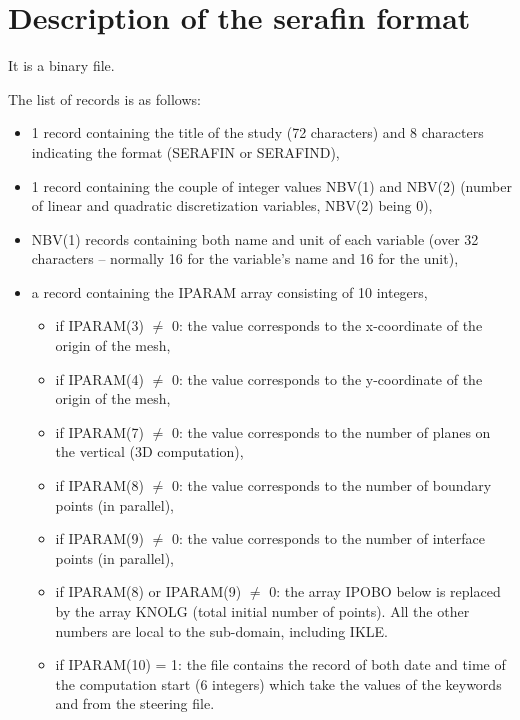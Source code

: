 \chapter{Description of the serafin format}
\label{sec:srffmt}
It is a binary file.

The list of records is as follows:

\begin{itemize}
\item 1 record containing the title of the study (72 characters) and 8
characters indicating the format (SERAFIN or SERAFIND),

\item 1 record containing the couple of integer values NBV(1)
and NBV(2) (number of linear and quadratic discretization
variables, NBV(2) being 0),

\item NBV(1) records containing both name and unit of each
variable (over 32 characters -- normally 16 for the variable's name and 16 for
the unit),

\item a record containing the IPARAM array consisting of 10 integers,

\begin{itemize}

\item if IPARAM(3) $\neq$ 0: the value corresponds to the
x-coordinate of the origin of the mesh,

\item if IPARAM(4) $\neq$ 0: the value corresponds to the
y-coordinate of the origin of the mesh,

\item if IPARAM(7) $\neq$ 0: the value corresponds to the
number of planes on the vertical (3D computation),

\item if IPARAM(8) $\neq$ 0: the value corresponds to the
number of boundary points (in parallel),

\item if IPARAM(9) $\neq$ 0: the value corresponds to the
number of interface points (in parallel),

\item if IPARAM(8) or IPARAM(9) $\neq$ 0: the
array IPOBO below is replaced by the array KNOLG (total initial number of
points). All the other numbers are local to the sub-domain, including IKLE.

\item if IPARAM(10) = 1: the file contains the record of both date and time of
the computation start (6 integers) which take the values of the keywords
 and  from the
steering file.
\end{itemize}


\end{itemize}
